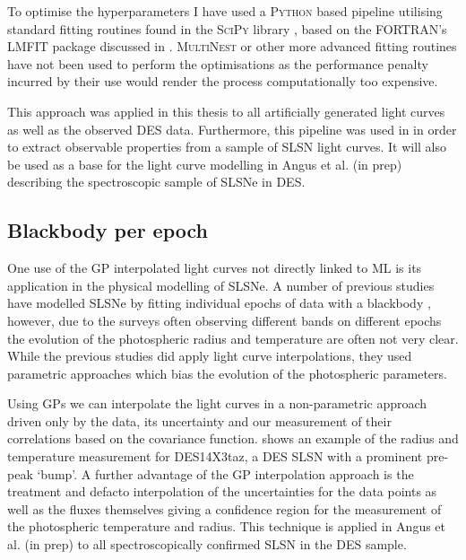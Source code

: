 To optimise the hyperparameters I have used a \textsc{Python} based pipeline utilising standard fitting routines found in the \textsc{SciPy} library \citep{Oliphant2007}, based on the \textsc{FORTRAN}'s \textsc{LMFIT} package discussed in . \textsc{MultiNest} or other more advanced fitting routines have not been used to perform the optimisations as the performance penalty incurred by their use would render the process computationally too expensive.

This approach was applied in this thesis to all artificially generated light curves as well as the observed DES data. Furthermore, this pipeline was used in \citet{Inserra2018} in order to extract observable properties from a sample of SLSN light curves. It will also be used as a base for the light curve modelling in Angus et al. (in prep) describing the spectroscopic sample of SLSNe in DES.

\subsection{Blackbody per epoch}
One use of the GP interpolated light curves not directly linked to ML is its application in the physical modelling of SLSNe. A number of previous studies have modelled SLSNe by fitting individual epochs of data with a blackbody \citep{Howell2013,Papadopuplus2014,Smith2016,Nicholl2017}, however, due to the surveys often observing different bands on different epochs the evolution of the photospheric radius and temperature are often not very clear. While the previous studies did apply light curve interpolations, they used parametric approaches which bias the evolution of the photospheric parameters.

Using GPs we can interpolate the light curves in a non-parametric approach driven only by the data, its uncertainty and our measurement of their correlations based on the covariance function.  shows an example of the radius and temperature measurement for DES14X3taz, a DES SLSN with a prominent pre-peak `bump'. A further advantage of the GP interpolation approach is the treatment and defacto interpolation of the uncertainties for the data points as well as the fluxes themselves giving a confidence region for the measurement of the photospheric temperature and radius. This technique is applied in Angus et al. (in prep) to all spectroscopically confirmed SLSN in the DES sample.

